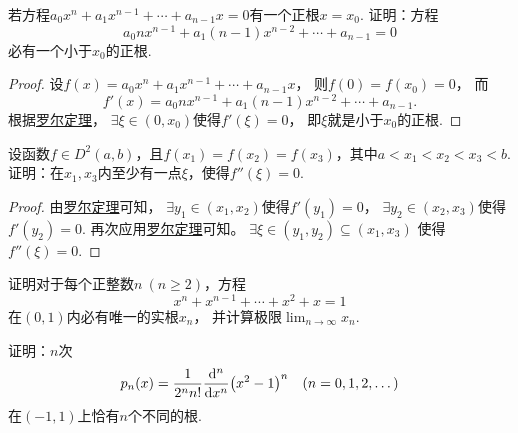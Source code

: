 \begin{example}\label{example:微分中值定理.一元高次方程的根的存在性}
若方程\(a_0 x^n + a_1 x^{n-1} + \dotsb + a_{n-1} x = 0\)有一个正根\(x = x_0\).
证明：方程\[
	a_0 n x^{n-1} + a_1 (n-1) x^{n-2} + \dotsb + a_{n-1} = 0
\]必有一个小于\(x_0\)的正根.
\begin{proof}
设\(f(x) = a_0 x^n + a_1 x^{n-1} + \dotsb + a_{n-1} x\)，
则\(f(0) = f(x_0) = 0\)，
而\[
	f'(x) = a_0 n x^{n-1} + a_1 (n-1) x^{n-2} + \dotsb + a_{n-1}.
\]
根据\hyperref[theorem:微分中值定理.罗尔定理]{罗尔定理}，
\(\exists \xi \in (0,x_0)\)使得\(f'(\xi) = 0\)，
即\(\xi\)就是小于\(x_0\)的正根.
\end{proof}
\end{example}
\begin{example}
设函数\(f \in D^2(a,b)\)，且\(f(x_1) = f(x_2) = f(x_3)\)，其中\(a < x_1 < x_2 < x_3 < b\).
证明：在\(x_1,x_3\)内至少有一点\(\xi\)，使得\(f''(\xi) = 0\).
\begin{proof}
由\hyperref[theorem:微分中值定理.罗尔定理]{罗尔定理}可知，
\(\exists y_1\in(x_1,x_2)\)使得\(f'(y_1) = 0\)，
\(\exists y_2\in(x_2,x_3)\)使得\(f'(y_2) = 0\).
再次应用\hyperref[theorem:微分中值定理.罗尔定理]{罗尔定理}可知。
\(\exists \xi\in(y_1,y_2)\subseteq(x_1,x_3)\)
使得\(f''(\xi) = 0\).
\end{proof}
\end{example}
\begin{example}
证明对于每个正整数\(n\ (n\geq2)\)，方程\[
	x^n + x^{n-1} + \dotsb + x^2 + x = 1
\]在\((0,1)\)内必有唯一的实根\(x_n\)，
并计算极限\(\lim_{n\to\infty} x_n\).
\end{example}

\begin{example}
证明：\(n\)次\[
	p_n(x) = \frac1{2^n n!} \dv[n]{x} (x^2-1)^n
	\quad(n=0,1,2,\dotsc)
\]在\((-1,1)\)上恰有\(n\)个不同的根.
\end{example}

